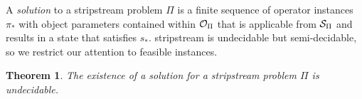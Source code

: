\documentclass[letterpaper]{article} %
\newcommand\note[1]{\todo[inline, color=blue!10, linecolor=blue!90,
  size=\footnotesize]{\linespread{0.9}\selectfont{{\bf CRG:} #1}\par}}
\newcommand\lpknote[1]{\todo[inline, color=green!10, linecolor=green!90,
  size=\footnotesize]{\linespread{0.9}\selectfont{{\bf LPK:} #1}\par}}
\theoremstyle{plain}\newtheorem{thm}{Theorem}
\theoremstyle{definition}\newtheorem{defn}{Definition}
\theoremstyle{plain}\newtheorem{lem}{Lemma}
\theoremstyle{plain}\newtheorem{cor}{Corollary}
\newcommand{\algname}{{\sc strips}tream}
\begin{document}

A {\em solution} to a \algname{} problem $\Pi$ is a finite sequence of operator instances $\pi_*$ with object parameters contained within ${\cal O}_\Pi$ that is applicable from ${\cal S}_\Pi$ and results in a state that satisfies $s_*$.
\algname{} is undecidable but semi-decidable, so we restrict our attention
to feasible instances.

\begin{thm}\label{thm:decide}
The existence of a solution for a \algname{} problem $\Pi$ is
undecidable. 
\end{thm}
\end{document}
